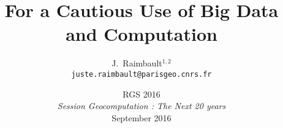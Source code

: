 \documentclass[french,11pt]{beamer}
\begin{document}
\title{For a Cautious Use of Big Data and Computation}

\author{J.~Raimbault$^{1,2}$\\
\texttt{juste.raimbault@parisgeo.cnrs.fr}
}




\date{RGS 2016\\\smallskip
\textit{Session Geocomputation : The Next 20 years}\\\smallskip
September 2016
}

\frame{\maketitle}











\end{document}
